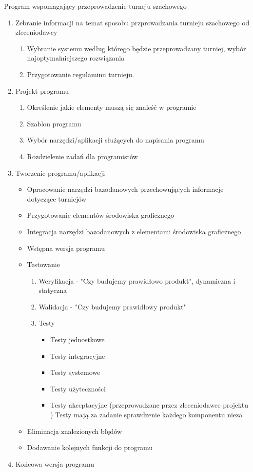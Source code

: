 \begin{example}
Program wspomagający przeprowadzenie turneju szachowego
\begin{enumerate}
\item Zebranie informacji na temat sposobu przprowadzania turnieju szachowego od zleceniodawcy
\begin{enumerate}
	\item Wybranie systemu według którego będzie przeprowadzany turniej, wybór najoptymalniejszego rozwiązania
	\item Przygotowanie regulaminu turnieju.
\end{enumerate}
\item Projekt programu
\begin{enumerate}
\item Określenie jakie elementy muszą się znaleść w programie
\item Szablon programu
\item Wybór narzędzi/aplikacji służących do napisania programu
\item Rozdzielenie zadań dla programistów
\end{enumerate}
\item Tworzenie programu/aplikacji
\begin{itemize}
\item Opracowanie narzędzi bazodanowych przechowujących informacje dotyczące turniejów
\item Przygotowanie elementów środowiska graficznego
\item Integracja narzędzi bazodanowych z elementami środowiska graficznego

\item Wstępna wersja programu
\item Testowanie
\begin{enumerate}
	\item Weryfikacja - "Czy budujemy prawidłowo produkt", dynamiczna i statyczna
	\item Walidacja - "Czy budujemy prawidłowy produkt"
	\item Testy
	\begin{itemize}
		\item Testy jednostkowe
		\item Testy integracyjne
		\item Testy systemowe
		\item Testy użyteczności
		\item Testy akceptacyjne (przeprowadzane przez zleceniodawce projektu
	)
	Testy mają za zadanie sprawdzenie każdego komponentu nieza
	\end{itemize}
\end{enumerate}
\item Eliminacja znalezionych błędów
\item Dodawanie kolejnych funkcji do programu

\end{itemize}
\item Końcowa wersja programu

\end{enumerate}
\end{example}

